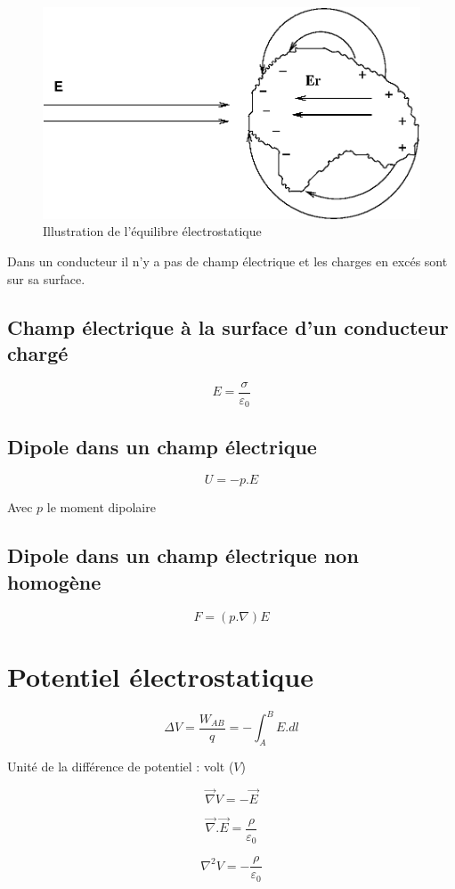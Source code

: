 \documentclass[a4paper,10pt,openright,titlepage]{report}
\begin{document}
\begin{figure}[!h]
\centering
\includegraphics{eqelec.eps}
\caption{Illustration de l'équilibre électrostatique}
\end{figure}

Dans un conducteur il n'y a pas de champ électrique et les charges en excés sont sur sa surface.

\subsection{Champ électrique à la surface d'un conducteur chargé}
$$E = \frac{\sigma}{\varepsilon_0}$$

\subsection{Dipole dans un champ électrique}
$$U = -p.E$$

Avec $p$ le moment dipolaire

\subsection{Dipole dans un champ électrique non homogène}

$$F=(p.\nabla)E$$

\section{Potentiel électrostatique}
$$\Delta V = \frac{W_{AB}}{q} = - \int_A^B E.dl$$

Unité de la différence de potentiel : volt ($V$)

$$\vec \nabla V = - \vec E$$

$$\vec \nabla . \vec E = \frac{\rho}{\varepsilon_0}$$

$$\nabla^2 V = - \frac{\rho}{\varepsilon_0}$$
\end{document}
